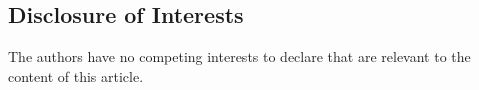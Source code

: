 \documentclass{article}
\begin{document}
\subsection*{Disclosure of Interests} 
The authors have no competing interests to declare that are relevant to the content of this article. 




\end{document}

